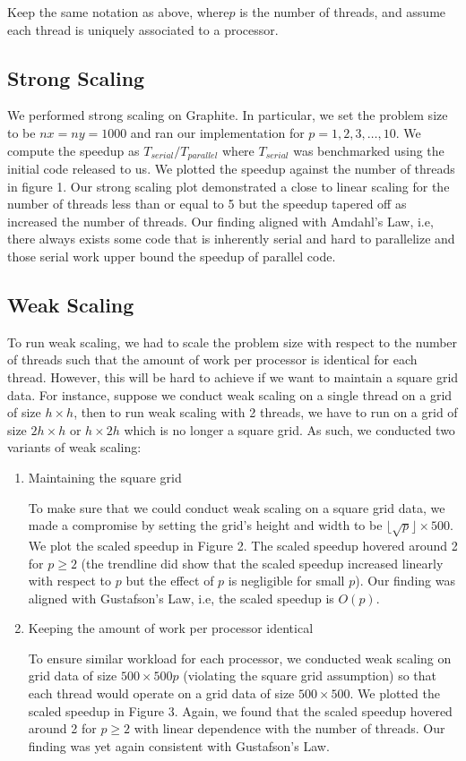 \documentclass{article}
\begin{document}
Keep the same notation as above, where$p$ is the number of threads, and assume each thread is uniquely associated to a processor.

\subsection{Strong Scaling}

We performed strong scaling on Graphite. In particular, we set the problem size to be $nx = ny = 1000$ and ran our implementation for $p = 1, 2, 3, \ldots, 10$. We compute the speedup as $T_{serial} / T_{parallel}$ where $T_{serial}$ was benchmarked using the initial code released to us. We plotted the speedup against the number of threads in figure 1. Our strong scaling plot demonstrated a close to linear scaling for the number of threads less than or equal to 5 but the speedup tapered off as increased the number of threads. Our finding aligned with Amdahl’s Law, i.e, there always exists some code that is inherently serial and hard to parallelize and those serial work upper bound the speedup of parallel code.

\subsection{Weak Scaling}
To run weak scaling, we had to scale the problem size with respect to the number of threads such that the amount of work per processor is identical for each thread. However, this will be hard to achieve if we want to maintain a square grid data. For instance, suppose we conduct weak scaling on a single thread on a grid of size $h \times h$, then to run weak scaling with 2 threads, we have to run on a grid of size $2h \times h$ or $h \times 2h$ which is no longer a square grid. As such, we conducted two variants of weak scaling:

\begin{enumerate}
    \item Maintaining the square grid

    To make sure that we could conduct weak scaling on a square grid data, we made a compromise by setting the grid’s height and width to be $\lfloor \sqrt{p} \rfloor \times 500$. We plot the scaled speedup in Figure 2. The scaled speedup hovered around 2 for $p \ge 2$ (the trendline did show that the scaled speedup increased linearly with respect to $p$ but the effect of $p$ is negligible for small $p$). Our finding was aligned with Gustafson’s Law, i.e, the scaled speedup is $O(p)$.

    \item Keeping the amount of work per processor identical

    To ensure similar workload for each processor, we conducted weak scaling on grid data of size $500 \times 500p$ (violating the square grid assumption) so that each thread would operate on a grid data of size $500 \times 500$. We plotted the scaled speedup in Figure 3. Again, we found that the scaled speedup hovered around 2 for $p \ge 2$ with linear dependence with the number of threads. Our finding was yet again consistent with Gustafson’s Law.
\end{enumerate}
\end{document}
